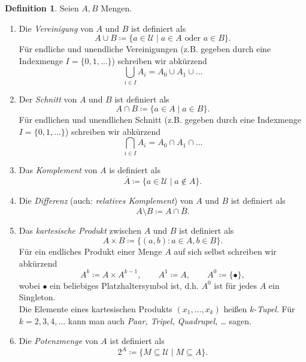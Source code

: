 \documentclass[11pt, a4paper]{article}
\theoremstyle{definition}
\newtheorem{definition}{Definition}[section]
\theoremstyle{plain}
\numberwithin{equation}{section}
\newcommand{\comp}[1]{\overline{#1}}
\begin{document}
\begin{definition}\label{def:setops}
	Seien $A, B$ Mengen. 
	\begin{enumerate}[label=(\alph*)]
		\item Die \textit{Vereinigung} von $A$ und $B$ ist definiert als 
			$$ 
				A \cup B \coloneqq \{ a \in \mathcal{U} \mid a \in A \text{ oder } a \in B \}.
			$$
			Für endliche und unendliche Vereinigungen (z.B. gegeben durch eine Indexmenge $I = \{ 0, 1, \ldots \}$) schreiben wir abkürzend
			$$
				\bigcup_{i \in I} A_i = A_0 \cup A_1 \cup \ldots
			$$
		\item Der \textit{Schnitt} von $A$ und $B$ ist definiert als
			$$
				A \cap B \coloneqq \{ a \in A \mid a \in B \}.
			$$
			Für endlichen und unendlichen Schnitt (z.B. gegeben durch eine Indexmenge $I = \{ 0, 1, \ldots \}$) schreiben wir abkürzend
			$$
				\bigcap_{i \in I} A_i = A_0 \cap A_1 \cap \ldots
			$$
		\item Das \textit{Komplement} von $A$ is definiert als
			$$
				\comp{A} \coloneqq \{ a \in \mathcal{U} \mid a \notin A \}.
			$$
		\item Die \textit{Differenz} (auch: \textit{relatives Komplement}) von $A$ und $B$ ist definiert als
			$$
				A \setminus B \coloneqq A \cap \comp{B}.
			$$
		\item Das \textit{kartesische Produkt} zwischen $A$ und $B$ ist definiert als
			$$
				A \times B \coloneqq \{(a, b) : a \in A, b \in B \}.
			$$
			Für ein endliches Produkt einer Menge $A$ auf sich selbst schreiben wir abkürzend
			$$
				A^k \coloneqq A \times A^{k-1}, \quad\quad A^1 \coloneqq A, \quad\quad A^0 \coloneqq \{ \bullet \},
			$$
			wobei $\bullet$ ein beliebiges Platzhaltersymbol ist, d.h. $A^0$ ist für jedes $A$ ein Singleton.\\
			Die Elemente eines kartesischen Produkts $(x_1, \ldots, x_k)$ heißen $k$-\textit{Tupel}. Für $k = 2, 3, 4, \ldots$ kann man auch \textit{Paar, Tripel, Quadrupel, \ldots} sagen.
		\item Die \textit{Potenzmenge} von $A$ ist definiert als
			$$
				2^A \coloneqq \{ M \subseteq \mathcal{U} \mid M \subseteq A \}.
			$$
	\end{enumerate}
\end{definition}
\end{document}
